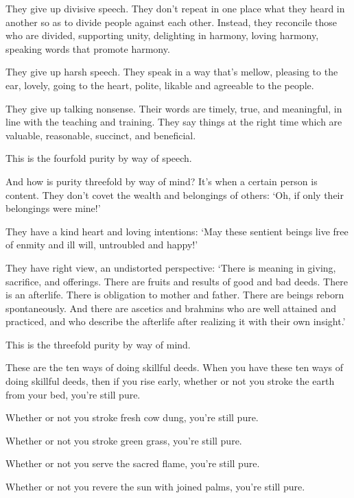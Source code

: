 \documentclass[12pt,openany]{book}%
\begin{document}
They give up divisive speech. They don’t repeat in one place what they heard in another so as to divide people against each other. Instead, they reconcile those who are divided, supporting unity, delighting in harmony, loving harmony, speaking words that promote harmony. 

They give up harsh speech. They speak in a way that’s mellow, pleasing to the ear, lovely, going to the heart, polite, likable and agreeable to the people. 

They give up talking nonsense. Their words are timely, true, and meaningful, in line with the teaching and training. They say things at the right time which are valuable, reasonable, succinct, and beneficial. 

This is the fourfold purity by way of speech. 

And how is purity threefold by way of mind? It’s when a certain person is content. They don’t covet the wealth and belongings of others: ‘Oh, if only their belongings were mine!’ 

They have a kind heart and loving intentions: ‘May these sentient beings live free of enmity and ill will, untroubled and happy!’ 

They have right view, an undistorted perspective: ‘There is meaning in giving, sacrifice, and offerings. There are fruits and results of good and bad deeds. There is an afterlife. There is obligation to mother and father. There are beings reborn spontaneously. And there are ascetics and brahmins who are well attained and practiced, and who describe the afterlife after realizing it with their own insight.’ 

This is the threefold purity by way of mind. 

These are the ten ways of doing skillful deeds. When you have these ten ways of doing skillful deeds, then if you rise early, whether or not you stroke the earth from your bed, you’re still pure. 

Whether or not you stroke fresh cow dung, you’re still pure. 

Whether or not you stroke green grass, you’re still pure. 

Whether or not you serve the sacred flame, you’re still pure. 

Whether or not you revere the sun with joined palms, you’re still pure. 
\end{document}
